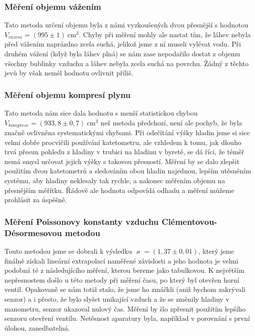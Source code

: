 \documentclass[english]{article}
\newcommand{\unit}[1]{\mathrm{#1}}
\begin{document}
			\subsubsection{Měření objemu vážením}
					Tato metoda určení objemu byla z námi vyzkoušených dvou přesnější  s hodnotou $V_{vazeni} = (995\pm1)\unit{\ cm^3}$. Chyby při měření mohly ale nastat tím, že láhev nebyla před vážením naprázdno zcela suchá, jelikož jsme z ní museli vylévat vodu. Při druhém vážení (když byla láhev plná) se nám zase nepodařilo dostat z objemu všechny bublinky vzduchu a láhev nebyla zcela suchá na povrchu. Žádný z těchto jevů by však neměl hodnotu ovlivnit příliš.
					
			\subsubsection{Měření objemu kompresí plynu}
					Tato metoda nám sice dala hodnotu s menší statistickou chybou $V_{komprese} = (933,8\pm0,7)\unit{\ cm^3}$ než metoda předchozí, není ale pochyb, že byla značně ovlivněna systematickými chybami. Při odečítání výšky hladin jsme si sice velmi dobře procvičili používání katetometru, ale vzhledem k tomu, jak dlouho trvá přesun pohledu z hladiny v trubici na hladinu v byretě, se dá říci, že téměř nemá smysl určovat jejich výšky s takovou přesností. Měření by se dalo zlepšit použitím dvou katetometrů a sledováním obou hladin najednou, lepším utěsněním systému, aby hladiny neklesaly tak rychle, a nakonec měřením objemu na přesnějším měřítku. Řádově ale hodnota odpovídá odhadu a měření můžeme prohlásit za úspěšné.
					
			\subsubsection{Měření Poissonovy konstanty vzduchu Clémentovou-Désormesovou metodou}
					Touto metodou jsme se dobrali k výsledku $\varkappa = (1,37\pm0,01)$, který jsme finálně získali lineární extrapolací naměřené závislosti a jeho hodnota je velmi podobná té z následujícího měření, kterou bereme jako tabulkovou. K největším nepřesnostem došlo u této metody při měření času, po který byl otevřen horní ventil. Opakovaně se nám totiž stalo, že jsme ho zmáčkli (aniž bychom zakrývali senzor) a i přesto, že bylo slyšet unikající vzduch a že se změnily hladiny v manometru, senzor ukazoval nulový čas. Měření by šlo zpřesnit použitím lepšího senzoru otevření ventilu. Netěsnost aparatury byla, například v porovnání s první úlohou, zanedbatelná.
			
\end{document}
